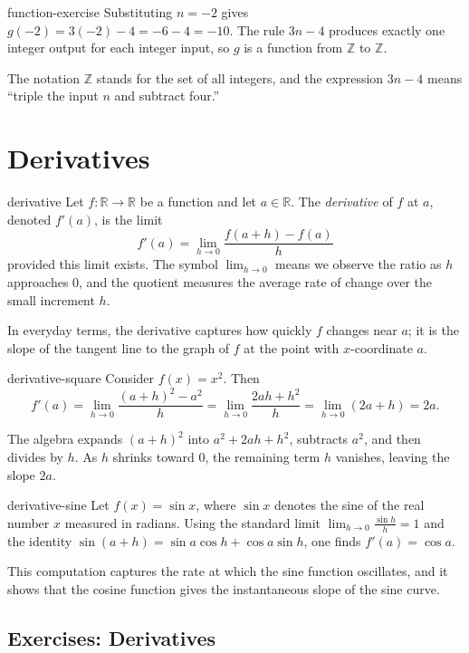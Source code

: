 \documentclass[11pt,a4paper]{article}
\begin{document}
\begin{exercisesolution}{function-exercise}
Substituting $n=-2$ gives $g(-2)=3(-2)-4=-6-4=-10$. The rule $3n-4$ produces exactly one integer output for each integer input, so $g$ is a function from $\mathbb{Z}$ to $\mathbb{Z}$.
\end{exercisesolution}
The notation $\mathbb{Z}$ stands for the set of all integers, and the expression $3n-4$ means ``triple the input $n$ and subtract four.''

\section{Derivatives}

\begin{definition}{}{derivative}
Let $f\colon \mathbb{R}\to \mathbb{R}$ be a function and let $a\in\mathbb{R}$. The \emph{derivative} of $f$ at $a$, denoted $f'(a)$, is the limit
\[
f'(a)=\lim_{h\to 0}\frac{f(a+h)-f(a)}{h}
\]
provided this limit exists. The symbol $\lim_{h\to 0}$ means we observe the ratio as $h$ approaches $0$, and the quotient measures the average rate of change over the small increment $h$.
\end{definition}
In everyday terms, the derivative captures how quickly $f$ changes near $a$; it is the slope of the tangent line to the graph of $f$ at the point with $x$-coordinate $a$.

\begin{example}{}{derivative-square}
Consider $f(x)=x^2$. Then
\[
f'(a)=\lim_{h\to 0}\frac{(a+h)^2-a^2}{h}=\lim_{h\to 0}\frac{2ah+h^2}{h}=\lim_{h\to 0}(2a+h)=2a.
\]
\end{example}
The algebra expands $(a+h)^2$ into $a^2+2ah+h^2$, subtracts $a^2$, and then divides by $h$. As $h$ shrinks toward $0$, the remaining term $h$ vanishes, leaving the slope $2a$.

\begin{example}{}{derivative-sine}
Let $f(x)=\sin x$, where $\sin x$ denotes the sine of the real number $x$ measured in radians. Using the standard limit $\lim_{h\to 0}\frac{\sin h}{h}=1$ and the identity $\sin(a+h)=\sin a\cos h+\cos a\sin h$, one finds $f'(a)=\cos a$.
\end{example}
This computation captures the rate at which the sine function oscillates, and it shows that the cosine function gives the instantaneous slope of the sine curve.

\subsection*{Exercises: Derivatives}
\end{document}

